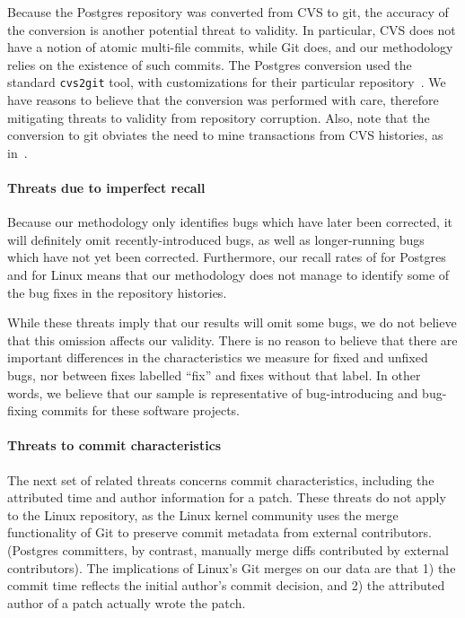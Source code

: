 Because the Postgres repository was converted from CVS to git, the
accuracy of the conversion is another potential threat to validity.  In
particular, CVS does not have a notion of atomic multi-file commits,
while Git does, and our methodology relies on the existence of such
commits. The Postgres conversion used the standard {\tt cvs2git} tool,
with customizations for their particular
repository~\cite{haas09:_so_why_postg_using_git}. We have reasons to
believe that the conversion was performed with care, therefore
mitigating threats to validity from repository corruption. 
Also, note that the conversion to git obviates the need to mine transactions
from CVS histories, as in~\cite{zimmermann-msr-2004}.

\paragraph{Threats due to imperfect recall}
Because our methodology only identifies bugs which have later been
corrected, it will definitely omit recently-introduced bugs, as well
as longer-running bugs which have not yet been corrected. Furthermore,
our recall rates of \postR for Postgres and \linuxR for Linux means
that our methodology does not manage to identify some of the bug fixes
in the repository histories.

While these threats imply that our results will omit some bugs, we do
not believe that this omission affects our validity. There is no
reason to believe that there are important differences in the
characteristics we measure for fixed and unfixed bugs, nor between
fixes labelled ``fix'' and fixes without that label. In other words,
we believe that our sample is representative of bug-introducing and
bug-fixing commits for these software projects.

\paragraph{Threats to commit characteristics}
The next set of related threats concerns commit characteristics,
including the attributed time and author information for a patch.
These threats do not apply to the Linux repository, as the Linux
kernel community uses the merge functionality of Git to preserve
commit metadata from external contributors. (Postgres committers, by
contrast, manually merge diffs contributed by external contributors).
The implications of Linux's Git merges on our data are that 1) the commit
time reflects the initial author's commit decision, and 2) the
attributed author of a patch actually wrote the patch.

